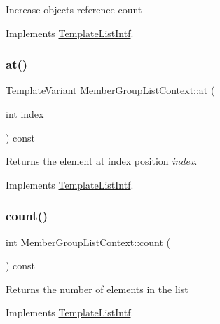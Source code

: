 Increase object\textquotesingle{}s reference count 

Implements \mbox{\hyperlink{class_template_list_intf_a4b4973e2e15396d10bc4e3085462ca2b}{Template\+List\+Intf}}.

\mbox{\label{class_member_group_list_context_a804c6afa443fa52659d4f19413f329bf}} 
\subsubsection{\texorpdfstring{at()}{at()}}
{\footnotesize\ttfamily \mbox{\hyperlink{class_template_variant}{Template\+Variant}} Member\+Group\+List\+Context\+::at (\begin{DoxyParamCaption}\item[{int}]{index }\end{DoxyParamCaption}) const\hspace{0.3cm}{\ttfamily [virtual]}}

Returns the element at index position {\itshape index}. 

Implements \mbox{\hyperlink{class_template_list_intf_aa51e57e72eacf4e8ce1055ee30a0f7f8}{Template\+List\+Intf}}.

\mbox{\label{class_member_group_list_context_a65ff4ee1ee899eabe742616a5ccf7648}} 
\subsubsection{\texorpdfstring{count()}{count()}}
{\footnotesize\ttfamily int Member\+Group\+List\+Context\+::count (\begin{DoxyParamCaption}{ }\end{DoxyParamCaption}) const\hspace{0.3cm}{\ttfamily [virtual]}}

Returns the number of elements in the list 

Implements \mbox{\hyperlink{class_template_list_intf_a329e49e33484c2aa5106aac1bf4e5216}{Template\+List\+Intf}}.

\mbox{\label{class_member_group_list_context_abc6f782dc3c8e8ed377d151805b3abbe}} 
